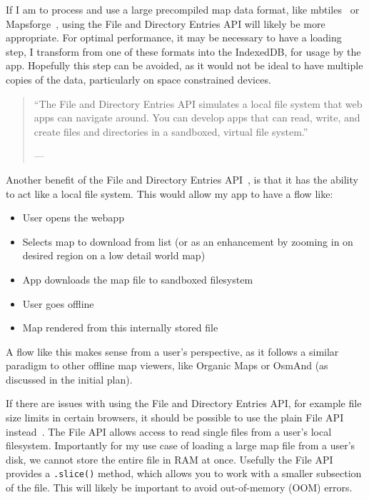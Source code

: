 \documentclass[]{final_report}
\begin{document}
If I am to process and use a large precompiled map data format, like mbtiles~\cite{mbtiles-spec} or Mapsforge~\cite{mapsforge-format}, using the File and Directory Entries API will likely be more appropriate. For optimal performance, it may be necessary to have a loading step, I transform from one of these formats into the IndexedDB, for usage by the app. Hopefully this step can be avoided, as it would not be ideal to have multiple copies of the data, particularly on space constrained devices.

\begin{quote}
    ``The File and Directory Entries API simulates a local file system that web apps can navigate around. You can develop apps that can read, write, and create files and directories in a sandboxed, virtual file system.''
    
    \footnotesize{--- }
\end{quote}

Another benefit of the File and Directory Entries API~\cite{w3c-file-directories-api}, is that it has the ability to act like a local file system. This would allow my app to have a flow like:

\begin{itemize}
    \item User opens the webapp
    \item Selects map to download from list (or as an enhancement by zooming in on desired region on a low detail world map)
    \item App downloads the map file to sandboxed filesystem
    \item User goes offline
    \item Map rendered from this internally stored file
\end{itemize}

A flow like this makes sense from a user's perspective, as it follows a similar paradigm to other offline map viewers, like Organic Maps or OsmAnd (as discussed in the initial plan).

If there are issues with using the File and Directory Entries API, for example file size limits in certain browsers, it should be possible to use the plain File API instead~\cite{w3c-file-api}. The File API allows access to read single files from a user's local filesystem. Importantly for my use case of loading a large map file from a user's disk, we cannot store the entire file in RAM at once. Usefully the File API provides a \texttt{.slice()} method, which allows you to work with a smaller subsection of the file. This will likely be important to avoid out-of-memory (OOM) errors.
\end{document}
